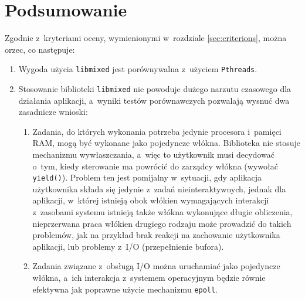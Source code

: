 \documentclass[12pt]{mwart}
\newcommand{\code}{\texttt}
\newcommand{\procbr}{()}
\newcommand{\function}[1]{\code{#1\procbr}}
\begin{document}
\section{Podsumowanie}
\label{sec:summary}
\indent
  Zgodnie z~kryteriami oceny, wymienionymi w~rozdziale \ref{sec:criterions}, można orzec, co następuje:
  \begin{enumerate}
    \item Wygoda użycia \code{libmixed} jest porównywalna z~użyciem \code{Pthreads}.
    \item Stosowanie biblioteki \code{libmixed} nie powoduje dużego narzutu czasowego dla działania aplikacji, a~wyniki testów porównawczych
      pozwalają wysnuć dwa zasadnicze wnioski:
      \begin{enumerate}
        \item Zadania, do których wykonania potrzeba jedynie procesora i~pamięci RAM, mogą być wykonane jako pojedyncze włókna.
          Biblioteka nie stosuje mechanizmu wywłaszczania, a~więc to użytkownik musi decydować o~tym, kiedy sterowanie ma powrócić do 
          zarządcy włókna (wywołać \function{yield}). Problem ten jest pomijalny w~sytuacji, gdy aplikacja użytkownika składa się
          jedynie z~zadań nieinteraktywnych, jednak dla aplikacji, w~której istnieją obok włókien wymagających interakcji z~zasobami systemu
          istnieją także włókna wykonujące długie obliczenia, nieprzerwana praca włókien drugiego rodzaju może prowadzić do takich problemów,
          jak na przykład brak reakcji na zachowanie użytkownika aplikacji, lub problemy z~I/O (przepełnienie bufora).\label{sec:firstone}
        \item Zadania związane z~obsługą I/O można uruchamiać jako pojedyncze włókna, a~ich interakcja z~systemem operacyjnym będzie równie
          efektywna jak poprawne użycie mechanizmu \code{epoll}.
      \end{enumerate}
  \end{enumerate}
\par
%
\newpage
\rhead{\empty}

\end{document}
